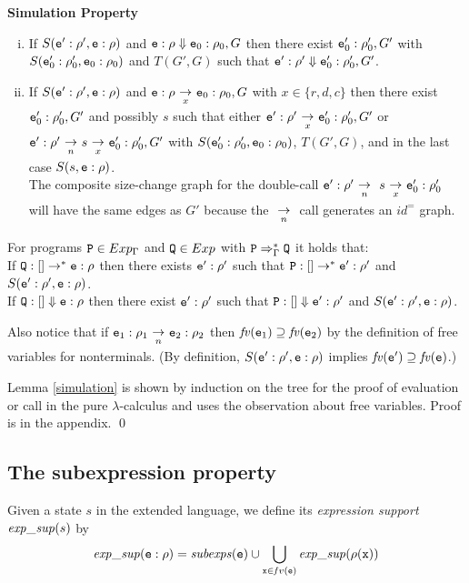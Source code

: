 \documentclass{LMCS}
\newcommand{\be}{\begin{enumerate}}
\newcommand{\ee}{\end{enumerate}}
\newcommand{\bdfn}{\begin{defi}}
\newcommand{\edfn}{\end{defi}}
\newcommand{\blem}{\begin{lem}}
\newcommand{\elem}{\end{lem}}
\newcommand{\bcor}{\begin{cor}}
\newcommand{\ecor}{\end{cor}}
\newcommand{\bprf}{\proof}
\newcommand{\eprf}{\qed}
\theoremstyle{definition}\newtheorem{env}[thm]{Environment}
\newcommand{\tosub}[1]{\raisebox{-6.0pt}{$\ \stackrel{\textstyle\to}{\vrule height4.5 pt width0 pt
    depth2.5 pt \smash{\scriptstyle#1}}\ $}}
\begin{document}
\blem \label{simulation}\rm{\bf Simulation Property}
\be[i)]
\item If $S({\tt e}':\rho',{\tt e}:\rho)$ and ${\tt e}:\rho\Downarrow {\tt e}_0:\rho_0,G$ then there exist ${\tt e}_0':\rho_0',G'$ with $S({\tt e}_0':\rho_0',{\tt e}_0:\rho_0)$ and $T(G',G)$ such that ${\tt e}':\rho'\Downarrow {\tt e}_0':\rho_0',G'$.
\item If $S({\tt e}':\rho',{\tt e}:\rho)$ and ${\tt e}:\rho\tosub{x} {\tt e}_0:\rho_0,G$ with $x\in\{r,d,c\}$ then there exist ${\tt e}_0':\rho_0',G'$ and possibly $s$ such that 
either ${\tt e}':\rho'\tosub{x} {\tt e}_0':\rho_0',G'$ or ${\tt e}':\rho'\tosub{n} s\tosub{x} {\tt e}_0':\rho_0',G'$ with $S({\tt e}_0':\rho_0',{\tt e}_0:\rho_0)$, $T(G',G)$, and in the last case $S(s,{\tt e}:\rho)$.\\ 
The composite size-change graph for the double-call $ {\tt e}':\rho'\tosub{n}\  s\tosub{x} {\tt e}_0':\rho_0'$ will have the same edges as $G'$ because the $\tosub{n}$ call generates an $id^=$ graph.
\ee
\elem

\bcor For programs ${\tt P}\in Exp_\Gamma$ and ${\tt Q}\in Exp$ with ${\tt P}\Rightarrow^*_\Gamma {\tt Q}$ it holds that:\\ 
If ${\tt Q}:[]\to^* {\tt e}:\rho$ then there exists ${\tt e}':\rho'$ such that ${\tt P}:[]\to^*{\tt e}':\rho'$ and $S({\tt e}':\rho',{\tt e}:\rho)$.\\
If ${\tt Q}:[]\Downarrow {\tt e}:\rho$ then there exist ${\tt e}':\rho'$ such that ${\tt P}:[]\Downarrow {\tt e}':\rho'$ and $S({\tt e}':\rho',{\tt e}:\rho)$.
\ecor

Also notice that if ${\tt e}_1:\rho_1\tosub{n} {\tt e}_2:\rho_2$ then $\mathit{fv}({\tt e}_1)\supseteq \mathit{fv}({\tt e}_2)$ by the definition of free variables for nonterminals. (By definition, $S({\tt e}':\rho',{\tt e}:\rho)$ implies $\mathit{fv}({\tt e}')\supseteq \mathit{fv}({\tt e})$.)

\bprf Lemma \ref{simulation} is shown by induction on the tree for the proof of evaluation or call in the pure $\lambda$-calculus and uses the observation about free variables. Proof is in the appendix.
\eprf

\subsection{The subexpression property}

\bdfn Given a state $s$ in the extended language, we define its
{\em expression support} ${\it exp\_sup}(s)$ by
\[{\it exp\_sup}({\tt e}:\rho) = {\it subexps}({\tt e}) \cup
  \bigcup_{{\tt x}\in{\mathit fv}({\tt e})}
     {\it exp\_sup}(\rho({\tt x}))
     \]
\edfn
\end{document}

